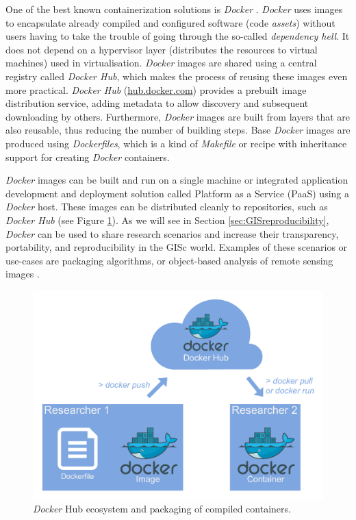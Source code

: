 \documentclass[ijgi,article,submit,moreauthors,pdftex]{Definitions/mdpi}
\begin{document}
One of the best known containerization solutions is \textit{Docker} \cite{merkel2014docker}. \textit{Docker} uses images to encapsulate already compiled and configured software (code \textit{assets}) without users having to take the trouble of going through the so-called \textit{dependency hell}. It does not depend on a hypervisor layer (distributes the resources to virtual machines) used in virtualisation. \textit{Docker} images are shared using a central registry called \textit{Docker Hub}, which makes the process of reusing these images even more practical. \textit{Docker Hub} (\url{hub.docker.com}) provides a prebuilt image distribution service, adding metadata to allow discovery and subsequent downloading by others. Furthermore, \textit{Docker} images are built from layers that are also reusable, thus reducing the number of building steps. Base \textit{Docker} images are produced using \textit{Dockerfiles}, which is a kind of \textit{Makefile} or recipe with inheritance support for creating \textit{Docker} containers.

\textit{Docker} images can be built and run on a single machine or integrated application development and deployment solution called Platform as a Service (PaaS) using a \textit{Docker} host. These images can be distributed cleanly to repositories, such as \textit{Docker Hub} (see Figure \ref{fig:docker_ecosystem}). As we will see in Section \ref{sec:GISreproducibility},  \textit{Docker} can be used to share research scenarios and increase their transparency, portability, and reproducibility in the GISc world. Examples of these scenarios or use-cases are packaging algorithms, or object-based analysis of remote sensing images \cite{knoth2017reproducibility}.

\begin{figure}[!ht]
  \centering
  \includegraphics[scale=0.46]{images/fig3.pdf}
  \caption{\textit{Docker} Hub ecosystem and packaging of compiled containers.}
  \label{fig:docker_ecosystem}
\end{figure}
\end{document}
